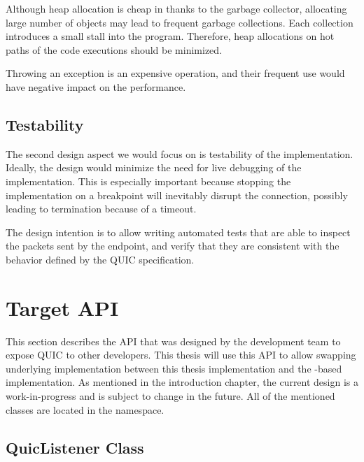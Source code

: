 \begin{itemize}

     Although heap allocation is cheap in \dotnet{} thanks
    to the garbage collector, allocating large number of objects may lead to frequent garbage
    collections. Each collection introduces a small stall into the program. Therefore,
    heap allocations on hot paths of the code executions should be minimized.

     Throwing an exception is an expensive operation, and
    their frequent use would have negative impact on the performance.

\end{itemize}

\subsection{Testability}

The second design aspect we would focus on is testability of the implementation. Ideally, the design
would minimize the need for live debugging of the implementation. This is especially important
because stopping the implementation on a breakpoint will inevitably disrupt the connection, possibly
leading to termination because of a timeout.

The design intention is to allow writing automated tests that are able to inspect the packets sent
by the endpoint, and verify that they are consistent with the behavior defined by the QUIC
specification.

\section{Target \dotnet{} API}

This section describes the API that was designed by the \dotnet{} development team to expose QUIC to
other developers. This thesis will use this API to allow swapping underlying implementation between
this thesis implementation and the \libmsquic{}-based implementation. As mentioned in the
introduction chapter, the current design is a work-in-progress and is subject to change in the
future. All of the mentioned classes are located in the  namespace.

\subsection{QuicListener Class}

